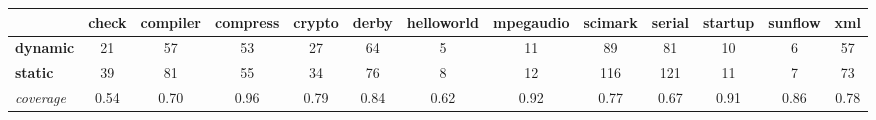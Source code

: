 \documentclass{fac}
\begin{document}
\begin{table} %
\centering
\begin{tabular*}{1.01\textwidth}{|l|c|c|c|c|c|c|c|c|c|c|c|c|}
\hline
 & \hspace{-2pt}check\hspace{-2pt} & \hspace{-2pt}compiler\hspace{-2pt} & \hspace{-2pt}compress\hspace{-2pt} & \hspace{-2pt}crypto\hspace{-2pt} & \hspace{-2pt}derby\hspace{-2pt} & \hspace{-2pt}helloworld\hspace{-2pt} & \hspace{-2pt}mpegaudio\hspace{-2pt} & \hspace{-2pt}scimark\hspace{-2pt} & \hspace{-2pt}serial\hspace{-2pt} & \hspace{-2pt}startup\hspace{-2pt} & \hspace{-2pt}sunflow\hspace{-2pt} & \hspace{-2pt}xml\hspace{-2pt}\\
\hline
\textbf{dynamic} & 21 & 57 & 53 & 27 & 64 & 5 & 11 & 89 & 81 & 10 & 6 & 57\\
\textbf{static} & 39 & 81 & 55 & 34 & 76 & 8 & 12 & 116 & 121 & 11 & 7 & 73\\
\textit{coverage} & 0.54 & 0.70 & 0.96 & 0.79 & 0.84 & 0.62 & 0.92 & 0.77 & 0.67 & 0.91 & 0.86 & 0.78\\

\end{tabular*}
\end{table}
\end{document}
